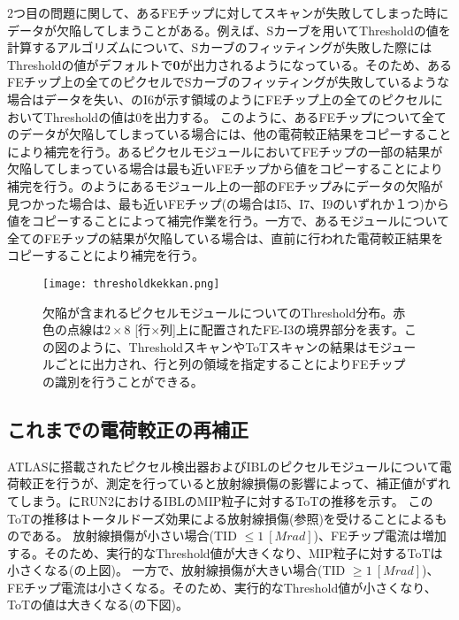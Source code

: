 2つ目の問題に関して、あるFEチップに対してスキャンが失敗してしまった時にデータが欠陥してしまうことがある。例えば、Sカーブを用いてThresholdの値を計算するアルゴリズムについて、Sカーブのフィッティングが失敗した際にはThresholdの値がデフォルトで\textbf{0}が出力されるようになっている。そのため、あるFEチップ上の全てのピクセルでSカーブのフィッティングが失敗しているような場合はデータを失い、のI6が示す領域のようにFEチップ上の全てのピクセルにおいてThresholdの値は$0$を出力する。
このように、あるFEチップについて全てのデータが欠陥してしまっている場合には、他の電荷較正結果をコピーすることにより補完を行う。あるピクセルモジュールにおいてFEチップの一部の結果が欠陥してしまっている場合は最も近いFEチップから値をコピーすることにより補完を行う。のようにあるモジュール上の一部のFEチップみにデータの欠陥が見つかった場合は、最も近いFEチップ(の場合はI5、I7、I9のいずれか１つ)から値をコピーすることによって補完作業を行う。一方で、あるモジュールについて全てのFEチップの結果が欠陥している場合は、直前に行われた電荷較正結果をコピーすることにより補完を行う。

\begin{figure}[tbp]
  \centering
  \texttt{[image: thresholdkekkan.png]}
  \caption[欠陥が含まれるピクセルモジュールについてのThreshold分布]{欠陥が含まれるピクセルモジュールについてのThreshold分布。赤色の点線は$2\times8$ [行$\times$列]上に配置されたFE-I3の境界部分を表す。この図のように、ThresholdスキャンやToTスキャンの結果はモジュールごとに出力され、行と列の領域を指定することによりFEチップの識別を行うことができる。}
  \label{fig:thresholdkekkan}
\end{figure}

\subsection{これまでの電荷較正の再補正}
\label{sec:prehosei}

ATLASに搭載されたピクセル検出器およびIBLのピクセルモジュールについて電荷較正を行うが、測定を行っていると放射線損傷の影響によって、補正値がずれてしまう。にRUN2におけるIBLのMIP粒子に対するToTの推移を示す。
このToTの推移はトータルドーズ効果による放射線損傷(参照)を受けることによるものである。
放射線損傷が小さい場合(TID $\leq1\ [\si{Mrad}]$)、FEチップ電流は増加する。そのため、実行的なThreshold値が大きくなり、MIP粒子に対するToTは小さくなる(の上図)。
一方で、放射線損傷が大きい場合(TID $\geq1\ [\si{Mrad}]$)、FEチップ電流は小さくなる。そのため、実行的なThreshold値が小さくなり、ToTの値は大きくなる(の下図)。

